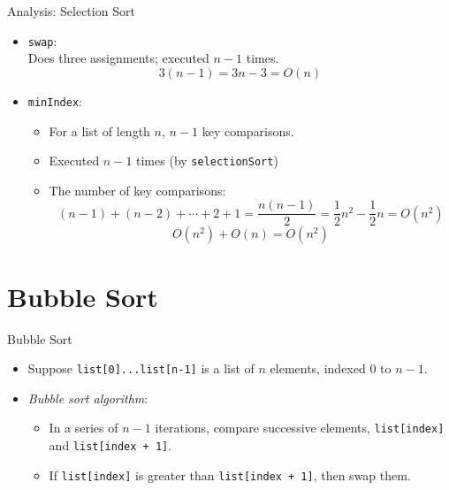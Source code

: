 \documentclass[14pt,aspectratio=1610]{beamer}
\begin{document}
\begin{frame}{Analysis: Selection Sort}
\begin{itemize}
  \item
    \texttt{swap}:\\
    Does three assignments; executed \(n - 1\) times.
    \begin{equation*}
      3(n - 1) = 3n - 3 = O(n)
    \end{equation*}
  \item<2->
    \texttt{minIndex}:
    \begin{itemize}
      \item
        For a list of length \(n\), \(n - 1\) key comparisons.
      \item
        Executed \(n - 1\) times (by \texttt{selectionSort})
      \item
        The number of key comparisons:
        \begin{equation*}
          (n-1)+(n-2)+\cdots+2+1=\frac{n(n-1)}{2}=\frac{1}{2} n^{2}-\frac{1}{2}n=O(n^{2})
        \end{equation*}
        \begin{equation*}
          O(n^2) + O(n) = O(n^2)
        \end{equation*}
  \end{itemize}
\end{itemize}
\end{frame}

\section{Bubble Sort}

\begin{frame}{Bubble Sort}
\begin{itemize}
  \item
    Suppose \lstinline{list[0]...list[n-1]} is a list of \(n\) elements, indexed \(0\) to \(n-1\).

  \item<2->
    \emph{Bubble sort algorithm}:
    \begin{itemize}
      \item
        In a series of $n-1$ iterations, compare successive elements, \lstinline{list[index]} and \lstinline{list[index + 1]}.
      \item
        If \lstinline{list[index]} is greater than \lstinline{list[index + 1]}, then swap them.
    \end{itemize}
\end{itemize}
\end{frame}
\end{document}
